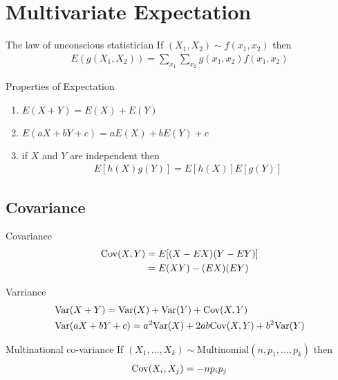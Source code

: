 \documentclass[16pt,a4paper]{article}
\begin{document}
\section{Multivariate Expectation}
\begin{thm}{The law of unconscious statistician}
    If $(X_1, X_2)\sim f(x_1, x_2)$ then 
    \begin{align*}
        E(g(X_1, X_2)) = \sum_{x_1}\sum_{x_2}g(x_1, x_2)f(x_1,x_2)
    \end{align*}
\end{thm}

\begin{thm}{Properties of Expectation}
    \begin{enumerate}[(1)]
        \item $E(X+Y) = E(X) + E(Y)$
        \item $E(aX+bY + c) = aE(X) + bE(Y) + c$
        \item if $X$ and $Y$ are independent then 
            \begin{align*}
                E[h(X)g(Y)] = E[h(X)]E[g(Y)]
            \end{align*}
    \end{enumerate}
\end{thm}
\subsection{Covariance}
\begin{defn}{Covariance}
    \begin{align*}
        \mathrm{Cov}(X,Y) &= E[(X-EX)(Y-EY)]\\
        &= E(XY) - (EX)(EY)
    \end{align*}
\end{defn}

\begin{defn}{Varriance}
    \begin{align*}
        &\mathrm{Var}(X+Y) = \mathrm{Var}(X) + \mathrm{Var}(Y) + \mathrm{Cov}(X,Y)\\
        &\mathrm{Var}(aX+bY+c) = a^2\mathrm{Var}(X) + 2ab\mathrm{Cov}(X,Y) + b^2\mathrm{Var}(Y)
    \end{align*}
\end{defn}
\begin{thm}{Multinational co-variance}
    If $(X_1, \ldots, X_k) \sim \text{Multinomial}(n, p_1, \ldots, p_k)$ then 
    \begin{align*}
        \mathrm{Cov}(X_i,X_j) = -np_ip_j
    \end{align*}
\end{thm}
\end{document}
